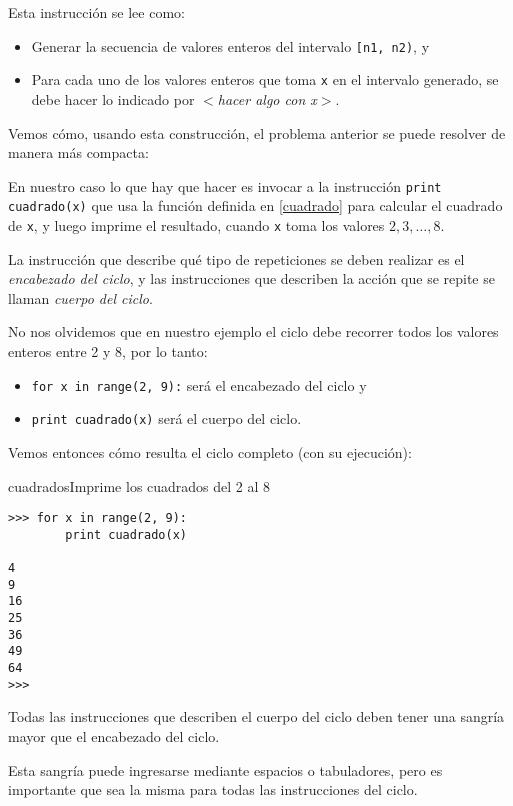 Esta instrucción se lee como:

\begin{itemize}
\item Generar la secuencia de valores enteros del intervalo \lstinline![n1, n2)!, y
\item Para cada uno de los valores enteros que toma \verb+x+ en el intervalo generado,
se debe hacer lo indicado por {\it $<$hacer algo con x$>$}.
\end{itemize}

Vemos cómo, usando esta construcción, el problema anterior se puede resolver
de manera más compacta:

\begin{solucion} En nuestro caso lo que hay que hacer es invocar a la
instrucción \lstinline!print cuadrado(x)!  que usa la función definida en
\ref{cuadrado} para calcular el cuadrado de \lstinline!x!, y luego imprime el
resultado, cuando \lstinline!x! toma los valores $2, 3, \ldots, 8$.

La instrucción que describe qué tipo de repeticiones se deben
realizar es el {\it encabezado del ciclo}, y las instrucciones que
describen la acción que se repite se llaman {\it cuerpo del
ciclo}.

No nos olvidemos que en nuestro ejemplo el ciclo debe recorrer todos los valores
enteros entre 2 y 8, por lo tanto:

\begin{itemize}
\item \lstinline+for x in range(2, 9):+ será el encabezado del ciclo y
\item \lstinline+print cuadrado(x)+ será el cuerpo del ciclo.
\end{itemize}

Vemos entonces cómo resulta el ciclo completo (con su ejecución):

\begin{codigo}{cuadrados}{Imprime los cuadrados del 2 al 8}
\begin{lstlisting}[numbers=none]
>>> for x in range(2, 9):
        print cuadrado(x)

4
9
16
25
36
49
64
>>>
\end{lstlisting}
\end{codigo}
\end{solucion}

\begin{atencion}
Todas las instrucciones que describen el cuerpo del ciclo deben tener una
sangría mayor que el encabezado del ciclo.

Esta sangría puede ingresarse mediante espacios o tabuladores, pero es
importante que sea la misma para todas las instrucciones del ciclo.
\end{atencion}

